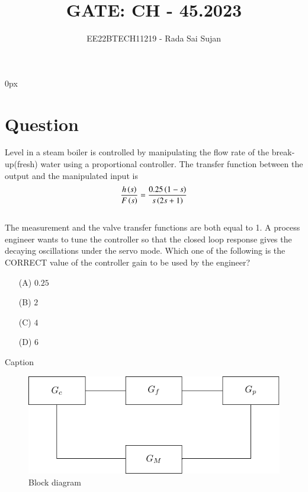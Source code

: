 \documentclass[journal,12pt,twocolumn]{IEEEtran}
\theoremstyle{remark}
\begin{document}
\parindent 0px

\title{GATE: CH - 45.2023}
\author{EE22BTECH11219 - Rada Sai Sujan$^{}$%
}
\maketitle
\newpage
\bigskip
\section*{Question}
Level  in a steam boiler is controlled by manipulating the flow rate  of the break-up(fresh) water using a proportional  controller. The transfer function between the output and the manipulated input is   \\
$$ \frac{h\left(s\right)}{F\left(s\right)}=\frac{0.25\left(1-s\right)}{s\left(2s+1\right)} $$   \\
The measurement and the valve transfer functions are both equal to 1. A process engineer wants to tune the controller so that the closed loop response gives the decaying oscillations under the servo mode. Which one of the following is the CORRECT value of the controller gain to be used by the engineer? \\
\begin{enumerate}
    \item[(A)] $0.25$
    \item[(B)] $2$
    \item[(C)] $4$
    \item[(D)] $6$
\end{enumerate}
\solution
\begin{table}[ht]
    \centering
    
    \caption{Caption}
    \label{tab:my_label}
\end{table}
\begin{figure}[ht]
    \centering
    \includegraphics[width=\columnwidth]{figs/fig1.pdf}
    \caption{Block diagram}
    \label{fig:ch.45.1}
\end{figure}    \\
\end{document}
